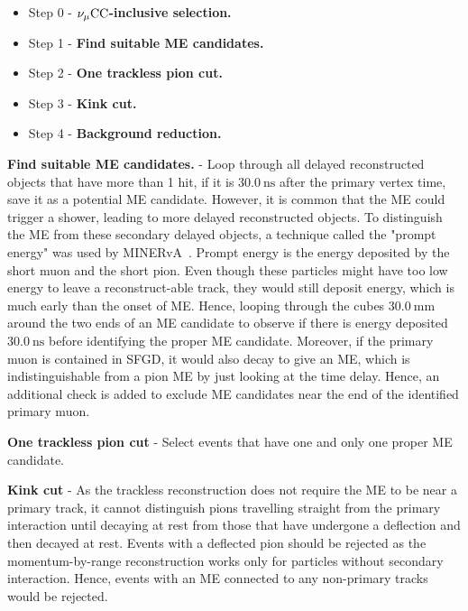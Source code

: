             \begin{itemize}
                \item Step 0 - \textbf{$\nu_{\mu}\textrm{CC}$-inclusive selection.}
                \item Step 1 - \textbf{Find suitable ME candidates.} 
                \item Step 2 - \textbf{One trackless pion cut.}
                \item Step 3 - \textbf{Kink cut.}
                \item Step 4 - \textbf{Background reduction.}
            \end{itemize}
        
            \textbf{Find suitable ME candidates.} - Loop through all delayed reconstructed objects that have more than 1 hit, if it is $30.0~\textrm{ns}$ after the primary vertex time, save it as a potential ME candidate. 
            However, it is common that the ME could trigger a shower, leading to more delayed reconstructed objects. 
            To distinguish the ME from these secondary delayed objects, a technique called the "prompt energy" was used by MINERvA~\cite{Zhang2016}. 
            Prompt energy is the energy deposited by the short muon and the short pion. 
            Even though these particles might have too low energy to leave a reconstruct-able track, they would still deposit energy, which is much early than the onset of ME. 
            Hence, looping through the cubes $30.0~\textrm{mm}$ around the two ends of an ME candidate to observe if there is energy deposited $30.0~\textrm{ns}$ before identifying the proper ME candidate. 
            Moreover, if the primary muon is contained in SFGD, it would also decay to give an ME, which is indistinguishable from a pion ME by just looking at the time delay. 
            Hence, an additional check is added to exclude ME candidates near the end of the identified primary muon. 
        
            \textbf{One trackless pion cut} - Select events that have one and only one proper ME candidate.
        
            \textbf{Kink cut} - As the trackless reconstruction does not require the ME to be near a primary track, it cannot distinguish pions travelling straight from the primary interaction until decaying at rest from those that have undergone a deflection and then decayed at rest. 
            Events with a deflected pion should be rejected as the momentum-by-range reconstruction works only for particles without secondary interaction. 
            Hence, events with an ME connected to any non-primary tracks would be rejected.
        
